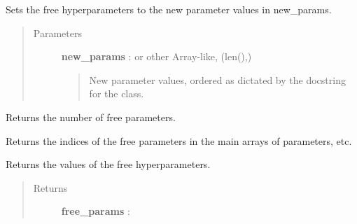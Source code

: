 \documentclass[letterpaper,10pt,english]{sphinxmanual}
\begin{document}
\begin{fulllineitems}

\begin{fulllineitems}
\label{gptools:gptools.mean.MeanFunction.param_bounds}
\end{fulllineitems}


\begin{fulllineitems}
\label{gptools:gptools.mean.MeanFunction.set_hyperparams}
Sets the free hyperparameters to the new parameter values in new\_params.
\begin{quote}\begin{description}
\item[{Parameters}] \leavevmode
\textbf{new\_params} :  or other Array-like, (len(),)
\begin{quote}

New parameter values, ordered as dictated by the docstring for the
class.
\end{quote}

\end{description}\end{quote}

\end{fulllineitems}


\begin{fulllineitems}
\label{gptools:gptools.mean.MeanFunction.num_free_params}
Returns the number of free parameters.

\end{fulllineitems}


\begin{fulllineitems}
\label{gptools:gptools.mean.MeanFunction.free_param_idxs}
Returns the indices of the free parameters in the main arrays of parameters, etc.

\end{fulllineitems}


\begin{fulllineitems}
\label{gptools:gptools.mean.MeanFunction.free_params}
Returns the values of the free hyperparameters.
\begin{quote}\begin{description}
\item[{Returns}] \leavevmode
\textbf{free\_params} : 
\begin{quote}


\end{quote}
\end{description}
\end{quote}
\end{fulllineitems}
\end{fulllineitems}
\end{document}
